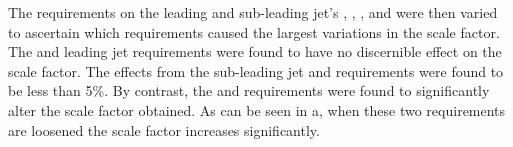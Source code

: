 The requirements on the leading and sub-leading jet's \pt, \Mjj, \jetmetdphi, \METnoMU and \METsig were then varied to ascertain which requirements caused the largest variations in the scale factor. The \METnoMU and leading jet \pt requirements were found to have no discernible effect on the scale factor. The effects from the sub-leading jet \pt and \METsig requirements were found to be less than 5\%. By contrast, the \jetmetdphi and \Mjj requirements were found to significantly alter the scale factor obtained. As can be seen in a, when these two requirements are loosened the scale factor increases significantly.

\begin{figure}
  \hspace{.1cm}

\end{figure}
